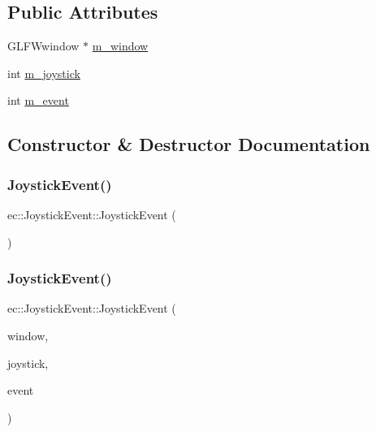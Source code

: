 \subsection*{Public Attributes}
\begin{DoxyCompactItemize}
\item 
G\+L\+F\+Wwindow $\ast$ \mbox{\hyperlink{structec_1_1_joystick_event_a9b108de0a7db9268dd11642a203ef816}{m\+\_\+window}}
\item 
int \mbox{\hyperlink{structec_1_1_joystick_event_a415b6d2d801b41db8f3dee6b2be35448}{m\+\_\+joystick}}
\item 
int \mbox{\hyperlink{structec_1_1_joystick_event_acf4361edcb473cbf0567137224c86f2a}{m\+\_\+event}}
\end{DoxyCompactItemize}


\subsection{Constructor \& Destructor Documentation}
\mbox{\label{structec_1_1_joystick_event_a04113c84c127415b3937c214b3e6eb92}} 
\subsubsection{\texorpdfstring{Joystick\+Event()}{JoystickEvent()}\hspace{0.1cm}{\footnotesize\ttfamily [1/2]}}
{\footnotesize\ttfamily ec\+::\+Joystick\+Event\+::\+Joystick\+Event (\begin{DoxyParamCaption}{ }\end{DoxyParamCaption})\hspace{0.3cm}{\ttfamily [explicit]}}

\mbox{\label{structec_1_1_joystick_event_ae08b4530293362fa1ecf1446f13e91e7}} 
\subsubsection{\texorpdfstring{Joystick\+Event()}{JoystickEvent()}\hspace{0.1cm}{\footnotesize\ttfamily [2/2]}}
{\footnotesize\ttfamily ec\+::\+Joystick\+Event\+::\+Joystick\+Event (\begin{DoxyParamCaption}\item[{G\+L\+F\+Wwindow $\ast$}]{window,  }\item[{int}]{joystick,  }\item[{int}]{event }\end{DoxyParamCaption})\hspace{0.3cm}{\ttfamily [explicit]}}

